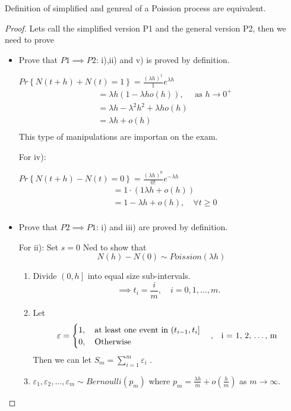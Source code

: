 \documentclass{article}
\theoremstyle{remark}
\newcommand{\newpara}
  {
  \vskip 0.4cm
  }
\begin{document}
\begin{theorem}
  Definition of simplified and genreal of a Poission process are equivalent.
\end{theorem}

\begin{proof}
  Lets call the simplified version P1 and the general version P2, then we need to prove 
  \begin{itemize}
    \item Prove that $P1 \implies  P2$: i),ii) and v) is proved by definition.
      
      \newpara
      
    $\displaystyle Pr \left \{  N\left( t + h \right) + N\left( t \right) = 1 \right \}  = \frac{\left( \lambda h \right)^{1}}{1}  e^{\lambda h}$ \[
        \begin{split}
     & = \lambda h \left( 1- \lambda  h o\left( h \right) \right) , \quad  \text{ as } h\to 0^{+}  \\ 
     &=  \lambda  h - \lambda ^{2} h^2 + \lambda h o\left( h \right) \\
     &=  \lambda h + o\left( h \right) \\
        \end{split} 
    \] 
    This type of manipulations are importan on the exam.
    
      For iv):
    \newpara
  $\displaystyle Pr \left \{ N\left( t+ h \right) - N\left( t \right) = 0 \right \} = \frac{\left( \lambda h \right)^{0}}{0!}  e^{-\lambda h}$ \[
  \begin{split}
    &=  1\cdot \left( 1  \lambda  h + o\left( h \right) \right) \\
    &= 1 - \lambda h + o\left( h \right), \quad \forall t\ge0  \\
  \end{split} 
  \] 
\item Prove that $P2 \implies  P1$: i) and iii) are proved by definition.
  
  \newpara
  For ii): Set $s = 0$ Ned to show that \[
  N\left( h \right) - N\left( 0 \right) \sim Poission\left( \lambda h \right)
  \] 
  \begin{enumerate}[label=(\roman*)]
    \item Divide $\left( 0, h \right ]$ into equal size sub-intervals.\[
    \implies  t_{i} = \frac{i}{m} , \quad  i=0,1, \ldots, m. 
    \] 
  \item Let \[
  \varepsilon = \begin{cases}
    1, \quad  \text{at least one event  in } (t_{i-1}, t_{i}] \\
    0, \quad \text{Otherwise} 
  \end{cases}
  , \quad  $i = 1, 2, \ldots, m $ 
  \] 
  Then we can let $\displaystyle S_{m} = \sum_{i=1}^{m} \varepsilon _{i} $ .
\item $\displaystyle  \varepsilon _{1} , \varepsilon _{2}, \ldots , \varepsilon _{m} \sim Bernoulli\left( p_{m} \right) $ where $p_{m} = \frac{\lambda h}{m}  + o\left( \frac{h}{m} \right) $  as $ m\to  \infty$. 
  

\end{enumerate}
\end{itemize}
\end{proof}
\end{document}
